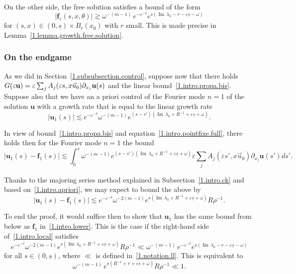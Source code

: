 \documentclass[10pt]{amsart}
\theoremstyle{definition}
\theoremstyle{plain}
\newcommand*\e{\varepsilon}
\newcommand{\dptl}{\partial}%
\newcommand{\ubf}{{\mathbf u}}
\newcommand*\f{{\mathbf f}}
\newcommand*\und{\underline}
\DeclareMathOperator{\Imm}{Im}
\begin{document}
On the other side, the free solution satisfies a bound of the form
\begin{equation}\label{1.intro.lower}
|\f_{\e}(s,x,\theta)| \gtrsim \omega^{-(m-1)}\,e^{-\e^{-\delta}} e^{s({\Imm}\,\lambda_0 - r - \e \und{s} - \omega)}
\end{equation}
for $(s,x)\in(0,\und{s})\times B_{r}(x_0)$ with $r$ small. This is made precise in Lemma~\ref{1.lemma.growth.free.solution}.



\subsubsection{On the endgame}\label{1.intro.endgame}
As we did in Section~\ref{1.subsubsection.control}, suppose now that there holds $G(\e\ubf) = \e \sum_j A_j(\e s, x \vec{u}_0)\linebreak\dptl_{x_j}\ubf(s)$ and the linear bound~\eqref{1.intro.propa.bis}. Suppose also that we have an a priori control of the Fourier mode $n=1$ of the solution $\ubf$ with a growth rate that is equal to the linear growth rate
\begin{equation}\label{1.intro.apriori}
|\ubf_1(s)| \lesssim e^{-\e^{-\delta}} \omega^{-(m-1)} e^{(s-s') ({\Imm}\,\lambda_0 + R^{-1} + \e \und{s} + \omega)}.
\end{equation}


In view of bound~\eqref{1.intro.propa.bis} and equation~\eqref{1.intro.pointfixe.full}, there holds then for the Fourier mode $n=1$ the bound
\[
|\ubf_1(s) - \f_1(s)| \lesssim \int_{0}^{s} \omega^{-(m-1)} e^{(s-s') ({\Imm}\,\lambda_0 + R^{-1} + \e \und{s} + \omega)} \e \sum_j A_j(\e s', x \vec{u}_0) \dptl_{x_j}\ubf(s') ds'.
\]


Thanks to the majoring series method explained in Subsection~\ref{1.intro.ck} and based on~\eqref{1.intro.apriori}, we may expect to bound the above by
\begin{equation}\label{1.intro.local}
|\ubf_1(s) - \f_1(s)| \lesssim e^{-\e^{-\delta}} \omega^{-2(m-1)} e^{s ({\Imm}\,\lambda_0 + R^{-1} + \e \und{s} + \omega)} R\rho^{-1}.
\end{equation}


To end the proof, it would suffice then to show that $\ubf_1$ has the same bound from below as $\f_1$ in~\eqref{1.intro.lower}. This is the case if the right-hand side of~\eqref{1.intro.local} satisfies
\begin{equation}\label{1.intro.intermediaire}
e^{-\e^{-\delta}} \omega^{-2(m-1)} e^{s ({\Imm}\,\lambda_0 + R^{-1} + \e \und{s} + \omega)} R\rho^{-1} \ll \omega^{-(m-1)}\,e^{-\e^{-\delta}} e^{s({\Imm}\,\lambda_0 - r - \e \und{s} - \omega)}
\end{equation}
for all $s\in(0,\und{s})$, where $\ll$ is defined in~\eqref{1.notation.ll}. This is equivalent to
\begin{equation}\label{1.intro.constraint}
\omega^{-(m-1)}\,e^{\und{s} (R^{-1} + r + \e \und{s} + \omega)} R\rho^{-1} \ll 1.
\end{equation}
\end{document}
